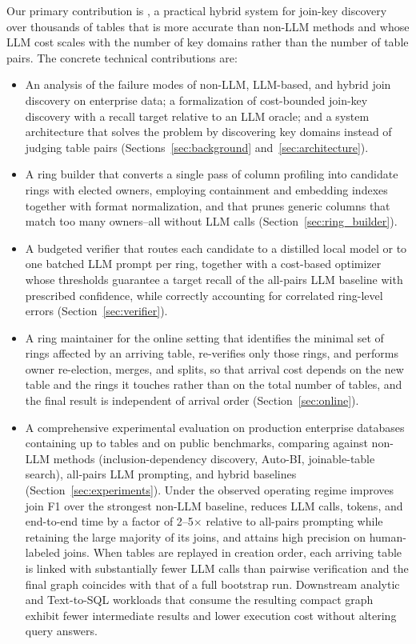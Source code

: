 Our primary contribution is \ourmethod, a practical hybrid system for join-key discovery over thousands of tables that is more accurate than non-LLM methods and whose LLM cost scales with the number of key domains rather than the number of table pairs. The concrete technical contributions are:
\begin{itemize}[leftmargin=*]
\item An analysis of the failure modes of non-LLM, LLM-based, and hybrid join discovery on enterprise data; a formalization of cost-bounded join-key discovery with a recall target relative to an LLM oracle; and a system architecture that solves the problem by discovering key domains instead of judging table pairs (Sections~\ref{sec:background} and~\ref{sec:architecture}).
\item A ring builder that converts a single pass of column profiling into candidate rings with elected owners, employing containment and embedding indexes together with format normalization, and that prunes generic columns that match too many owners--all without LLM calls (Section~\ref{sec:ring_builder}).
\item A budgeted verifier that routes each candidate to a distilled local model or to one batched LLM prompt per ring, together with a cost-based optimizer whose thresholds guarantee a target recall of the all-pairs LLM baseline with prescribed confidence, while correctly accounting for correlated ring-level errors (Section~\ref{sec:verifier}).
\item A ring maintainer for the online setting that identifies the minimal set of rings affected by an arriving table, re-verifies only those rings, and performs owner re-election, merges, and splits, so that arrival cost depends on the new table and the rings it touches rather than on the total number of tables, and the final result is independent of arrival order (Section~\ref{sec:online}).
\item A comprehensive experimental evaluation on  production enterprise databases containing up to  tables and on public benchmarks, comparing against non-LLM methods (inclusion-dependency discovery, Auto-BI, joinable-table search), all-pairs LLM prompting, and hybrid baselines (Section~\ref{sec:experiments}). Under the observed operating regime \ourmethod improves join F1 over the strongest non-LLM baseline, reduces LLM calls, tokens, and end-to-end time by a factor of 2--5$\times$ relative to all-pairs prompting while retaining the large majority of its joins, and attains high precision on human-labeled joins. When tables are replayed in creation order, each arriving table is linked with substantially fewer LLM calls than pairwise verification and the final graph coincides with that of a full bootstrap run. Downstream analytic and Text-to-SQL workloads that consume the resulting compact graph exhibit fewer intermediate results and lower execution cost without altering query answers.
\end{itemize}
